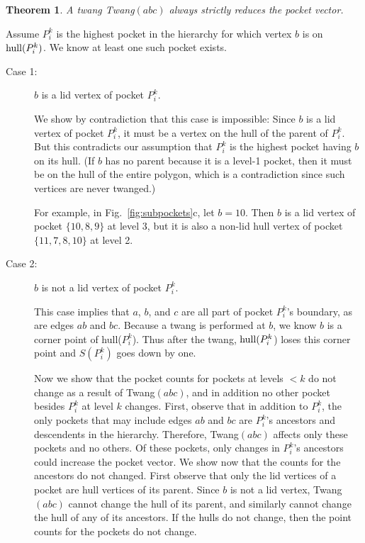 \pdfoutput=1  \documentclass{article}
\def\hull{\mathop{\rm hull}\nolimits}
\def\tw{{\sc Twang}}
\newtheorem{theorem}{{\bf Theorem}}
\newcommand{\figref}[1]{\ref{fig:#1}}
\newcommand{\ABox}{
\raisebox{3pt}{\framebox[6pt]{\rule{6pt}{0pt}}}
}
\newenvironment{pf}{{\bf Proof:}}{\hfill\ABox}
\begin{document}
\begin{theorem}
A twang \tw$(abc)$ always strictly reduces the pocket vector.
\end{theorem}
\begin{pf}
Assume $P^k_i$ is the highest pocket in the hierarchy for which 
vertex $b$ is on $\hull(P^k_i)$. 
We know at least one such pocket exists.   

\begin{description}
\item[Case 1:]
$b$ is a lid vertex of pocket $P^k_i$.

We show by contradiction that this case is impossible: Since $b$ is a lid 
vertex of pocket $P^k_i$, it must be a vertex on the hull of the parent of 
$P^k_i$. But this contradicts our assumption that $P^k_i$ is the highest 
pocket having $b$ on its hull. (If $b$ has no parent because it is a level-1 
pocket, then it must be on the hull of the entire polygon, which is a 
contradiction since such vertices are never twanged.)

For example, in Fig.~\figref{subpockets}c,
let $b=10$. Then $b$
is a lid vertex of pocket $\{10,8,9\}$ at level 3, 
but it is also a non-lid hull vertex of pocket $\{11,7,8,10\}$ at level 2.

\item[Case 2:]
$b$ is not a lid vertex of pocket $P^k_i$.

This case implies that $a$, $b$, and $c$ are all part of pocket $P^k_i$'s 
boundary, as are edges $ab$ and $bc$. Because a twang is performed at $b$, we 
know $b$ is a corner point of hull($P^k_i$). Thus after the twang, $\hull(P^k_i$) 
loses this corner point and $S(P^k_i)$ goes down by one.

Now we show that the pocket counts for pockets at levels $< k$ do not change 
as a result of \tw$(abc)$, and in addition no other pocket besides $P^k_i$ 
at level $k$ changes. First, observe that in addition to $P^k_i$, the only 
pockets that may include edges $ab$ and $bc$ are $P^k_i$'s ancestors and 
descendents in the hierarchy. Therefore, \tw$(abc)$ affects only these 
pockets and no others.  Of these pockets, only changes in $P^k_i$'s 
ancestors could increase the pocket vector. We show now that the counts for the 
ancestors do not changed. First observe that only the lid vertices of a 
pocket are hull vertices of its parent. Since $b$ is not a lid vertex, 
\tw$(abc)$ cannot change the hull of its parent, and similarly cannot 
change the hull of any of its ancestors. If the hulls do not change, then 
the point counts for the pockets do not change.
\end{description}
\end{pf}
\end{document}
